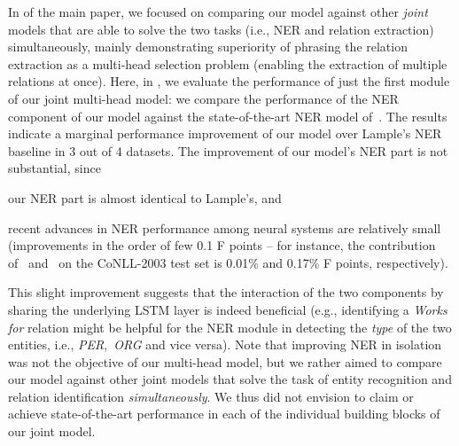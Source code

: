 \documentclass[review]{elsarticle}
\newcommand{\eg}{e.g., }
\newcommand{\ie}{i.e., }
\begin{document}
In  of the main paper, we focused on comparing our model against other \emph{joint} models that are able to solve the two tasks (\ie NER and relation extraction) simultaneously, mainly demonstrating superiority of phrasing the relation extraction as a multi-head selection problem (enabling the extraction of multiple relations at once). 
Here, in , we evaluate the performance of just the first module of our joint multi-head model: we compare the performance of the NER component of our model against the state-of-the-art NER model of~\cite{lample:16}. The results indicate a marginal performance improvement of our model over Lample's NER baseline in 3 out of 4 datasets. 
The improvement of our model's NER part is not substantial, since
\begin{enumerate*}[label=(\roman*)]
\item our NER part is almost identical to Lample's, and
\item recent advances in NER performance among neural systems are relatively small (improvements in the order of few 0.1 F points -- for instance, the contribution of~\cite{ma:16} and~\cite{lample:16} on the CoNLL-2003 test set is 0.01\% and 0.17\% F points, respectively).
\end{enumerate*}
This slight improvement suggests that the interaction of the two components by sharing the underlying LSTM layer is indeed beneficial (\eg identifying a \emph{Works for} relation might be helpful for the NER module in detecting the \emph{type} of the two entities, \ie \emph{PER},~\emph{ORG} and vice versa). 
Note that improving NER in isolation was not the objective of our multi-head model, but we rather aimed
to compare our model against other joint models that solve the task of entity recognition and relation identification \emph{simultaneously}. We thus did not envision to claim or achieve state-of-the-art performance in each of the individual building blocks of our joint model.
\end{document}
